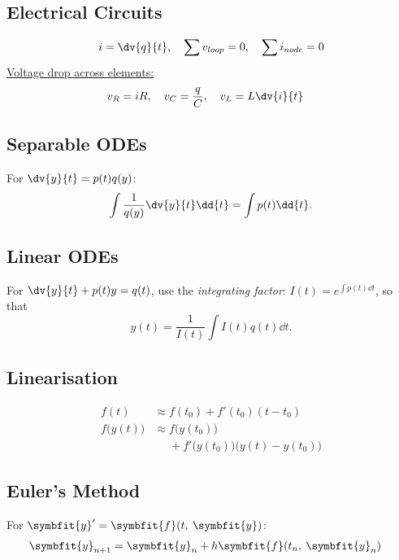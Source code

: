 \documentclass{article}
\begin{document}
\begin{multicols}{3}
    \subsection*{Electrical Circuits}
    \begin{align*}
        i = \dv{q}{t},\quad \sum v_{loop} = 0,\quad \sum i_{node} = 0
    \end{align*}
    \underline{Voltage drop across elements:}
    \begin{align*}
        v_R = iR,\quad v_C = \frac{q}{C},\quad v_L & = L \dv{i}{t}
    \end{align*}
    \subsection*{Separable ODEs}
    For \(\dv{y}{t} = p(t) q(y)\):
    \begin{equation*}
        \int \frac{1}{q(y)} \dv{y}{t} \dd{t} = \int p(t) \dd{t}.
    \end{equation*}
    \subsection*{Linear ODEs}
    For \(\dv{y}{t} + p(t)y = q(t)\), use the \textit{integrating factor}:
    \(I(t) = e^{\int p(t) \dd{t}}\), so that
    \begin{equation*}
        y(t) = \frac{1}{I(t)} \int I(t) q(t) \dd{t}.
    \end{equation*}
    \subsection*{Linearisation}
    \begin{align*}
        f(t)              & \approx f(t_0) + f'(t_0)(t-t_0)                                 \\
        f\bigl(y(t)\bigr) & \approx f\bigl(y(t_0)\bigr)                                     \\
                          & \phantom{\approx} + f'\bigl(y(t_0)\bigr)\bigl(y(t)-y(t_0)\bigr)
    \end{align*}
    \subsection*{Euler's Method}
    For \(\symbfit{y}' = \symbfit{f}(t,\: \symbfit{y})\):
    \begin{align*}
        \symbfit{y}_{n+1} & = \symbfit{y}_{n} + h\symbfit{f}(t_n,\: \symbfit{y}_n)
    \end{align*}

\end{multicols}
\end{document}
